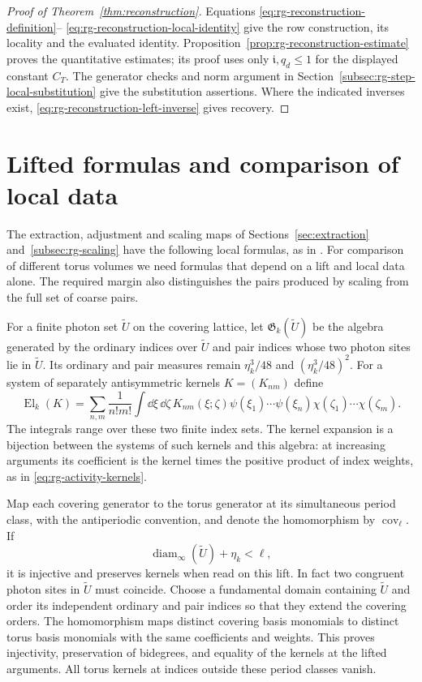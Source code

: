 \begin{proof}[Proof of Theorem~\ref{thm:reconstruction}]
Equations \eqref{eq:rg-reconstruction-definition}--%
\eqref{eq:rg-reconstruction-local-identity} give the row
construction, its locality and the evaluated identity.
Proposition~\ref{prop:rg-reconstruction-estimate} proves the
quantitative estimates; its proof uses only
\(\mathfrak i,q_d\le1\) for the displayed constant \(C_T\).
The generator checks and norm argument in
Section~\ref{subsec:rg-step-local-substitution} give the
substitution assertions. Where the indicated inverses exist,
\eqref{eq:rg-reconstruction-left-inverse} gives recovery.
\end{proof}
\appendix
\section{Lifted formulas and comparison of local data}
\label{subsec:rg-local-pullback}

The extraction, adjustment and scaling maps of
Sections~\ref{sec:extraction} and~\ref{subsec:rg-scaling}
have the following local formulas, as in
\cite[\S12.9]{QED3Manuscript}. For comparison of different torus volumes we
need formulas that depend on a lift and local data alone.
The required margin also distinguishes the pairs produced
by scaling from the full set of coarse pairs.

For a finite photon set $\widetilde U$ on the covering
lattice, let $\mathfrak G_k(\widetilde U)$ be the algebra
generated by the ordinary indices over $\widetilde U$
and pair indices whose two photon sites lie in
$\widetilde U$. Its ordinary and pair measures remain
$\eta_k^3/48$ and $(\eta_k^3/48)^2$. For a system of
separately antisymmetric kernels $K=(K_{nm})$ define
\[
 \operatorname{El}_k(K)
   =\sum_{n,m}\frac1{n!m!}\int\dd\xi\,\dd\zeta\,
                 K_{nm}(\xi;\zeta)\psi(\xi_1)\cdots\psi(\xi_n)
                                    \chi(\zeta_1)\cdots\chi(\zeta_m).
\]
The integrals range over these two finite index sets.
The kernel expansion is a bijection between the systems
of such kernels and this algebra: at increasing arguments
its coefficient is the kernel times the positive product
of index weights, as in \eqref{eq:rg-activity-kernels}.

Map each covering generator to the torus generator at
its simultaneous period class, with the antiperiodic
convention, and denote the homomorphism by
$\operatorname{cov}_\ell$. If
\begin{equation}\label{eq:rg-generator-pullback-margin}
 \operatorname{diam}_\infty(\widetilde U)+\eta_k<\ell,
\end{equation}
it is injective and preserves kernels when read on this
lift. In fact two congruent photon sites in
$\widetilde U$ must coincide. Choose a fundamental
domain containing $\widetilde U$ and order its
independent ordinary and pair indices so that they
extend the covering orders. The homomorphism maps
distinct covering basis monomials to distinct torus
basis monomials with the same coefficients and weights.
This proves injectivity, preservation of bidegrees,
and equality of the kernels at the lifted arguments.
All torus kernels at indices outside these period
classes vanish.

